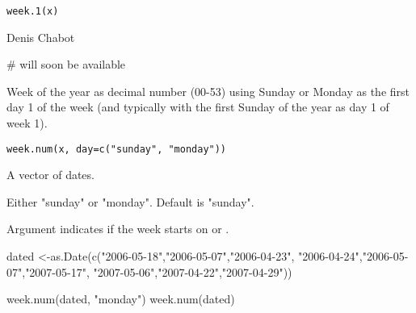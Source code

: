 \documentclass[a4paper]{book}
\begin{document}
%
\begin{Usage}
\begin{verbatim}
week.1(x)
\end{verbatim}
\end{Usage}
%
\begin{Arguments}
\begin{ldescription}
\item[\code{x}] 


\end{ldescription}
\end{Arguments}
%
\begin{Author}\relax
Denis Chabot
\end{Author}
%
\begin{Examples}
\begin{ExampleCode}
# will soon be available
\end{ExampleCode}
\end{Examples}
\newpage
{}
%
\begin{Description}\relax
Week of the year as decimal number (00-53) using Sunday or Monday as 
the first day 1 of the week (and typically with the first Sunday of the year as day 1 of week 1).
\end{Description}
%
\begin{Usage}
\begin{verbatim}
week.num(x, day=c("sunday", "monday"))
\end{verbatim}
\end{Usage}
%
\begin{Arguments}
\begin{ldescription}
\item[\code{x}] 
A vector of dates.

\item[\code{day}] 
Either "sunday" or "monday". Default is "sunday".

\end{ldescription}
\end{Arguments}
%
\begin{Details}\relax
Argument  indicates if the week starts on  or .
\end{Details}
%
\begin{Examples}
\begin{ExampleCode}
dated <-as.Date(c("2006-05-18","2006-05-07","2006-04-23",
                  "2006-04-24","2006-05-07","2007-05-17",
                  "2007-05-06","2007-04-22","2007-04-29"))
                  
week.num(dated, "monday")
week.num(dated)
\end{ExampleCode}
\end{Examples}
\printindex{}
\end{document}

